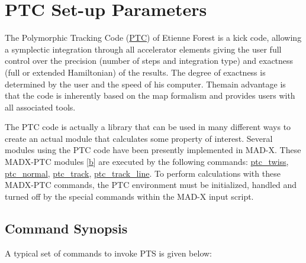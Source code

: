 
\chapter{PTC Set-up Parameters}

The Polymorphic Tracking Code (\hyperlink{E.Forest}{PTC}) of Etienne
Forest is a kick code, allowing a symplectic integration through all
accelerator elements giving the user full control over the precision
(number of   steps and integration type) and exactness (full or extended
Hamiltonian) of the   results. The degree of exactness is determined by
the user and the speed of his   computer. The\nolinebreak main advantage
is that the code is inherently based on the   map formalism and provides
users with all associated tools. 

The PTC code is actually a library that can be used in many different
ways to   create an actual module that calculates some property of
interest. Several   modules using the PTC code have been presently
implemented in MAD-X. These MADX-PTC modules [\hyperlink{F.Schmidt}{b}]
are   executed by the following   commands:
\href{../ptc_twiss/ptc_twiss.html}{  ptc\_twiss},
\href{../ptc_normal/ptc_normal.html}{  ptc\_normal},
\href{../ptc_track/ptc_track.html}{  ptc\_track},
\href{../ptc_track_line/ptc_track_line.html}{  ptc\_track\_line}. 
To perform calculations with these MADX-PTC commands, the PTC
environment must be initialized, handled and turned off by the special
commands within the MAD-X input script. 

\section{Command Synopsis}

A typical set of commands to invoke PTS is given below: 

